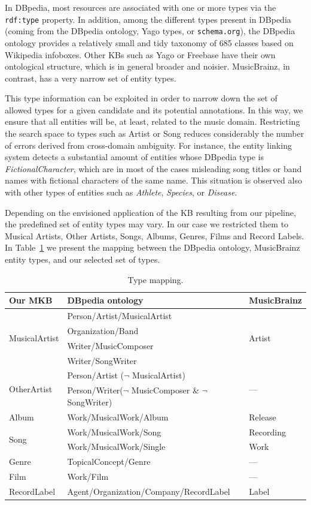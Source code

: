 In DBpedia, most resources are associated with one or more types via the \texttt{rdf:type} property. In addition, among the different types present in DBpedia (coming from the DBpedia ontology, Yago types, or \texttt{schema.org}), the DBpedia ontology provides a relatively small and tidy taxonomy of 685 classes based on Wikipedia infoboxes. Other KBs such as Yago or Freebase have their own ontological structure, which is in general broader and noisier. MusicBrainz, in contrast, has a very narrow set of entity types. 

This type information can be exploited in order to narrow down the set of allowed types for a given candidate and its potential annotations. In this way, we ensure that all entities will be, at least, related to the music domain. Restricting the search space to types such as Artist or Song reduces considerably the number of errors derived from cross-domain ambiguity. For instance, the entity linking system detects a substantial amount of entities whose DBpedia type is \textit{FictionalCharacter}, which are in most of the cases misleading song titles or band names with fictional characters of the same name. This situation is observed also with other types of entities such as \textit{Athlete}, \textit{Species}, or \textit{Disease}.

Depending on the envisioned application of the KB resulting from our pipeline, the predefined set of entity types may vary. In our case we restricted them to Musical Artists, Other Artists, Songs, Albums, Genres, Films and Record Labels. In Table~\ref{tbl:kb:type_mapping} we present the mapping between the DBpedia ontology, MusicBrainz entity types, and our selected set of types.

\begin{table}[]
\scriptsize
\centering
	\begin{tabular}{ l l l }
	\hline
\textbf{Our MKB} & \textbf{DBpedia ontology} & \textbf{MusicBrainz} \\
	\hline
\multirow{4}{*}{MusicalArtist} & Person/Artist/MusicalArtist & \multirow{4}{*}{Artist}\\ 
& Organization/Band & \\ 
& Writer/MusicComposer & \\ 
& Writer/SongWriter & \\
	\hline
\multirow{2}{*}{OtherArtist} & Person/Artist ($\neg$ MusicalArtist) & \multirow{2}{*}{---} \\
& Person/Writer($\neg$ MusicComposer \& $\neg$ SongWriter) & \\
    \hline
Album & Work/MusicalWork/Album & Release \\
    \hline
\multirow{2}{*}{Song} & Work/MusicalWork/Song & Recording \\
& Work/MusicalWork/Single & Work \\
    \hline
Genre & TopicalConcept/Genre & --- \\
    \hline
Film & Work/Film & --- \\
    \hline
RecordLabel & Agent/Organization/Company/RecordLabel & Label \\
    \hline
	\end{tabular}
	\caption{Type mapping.}
	\label{tbl:kb:type_mapping}
\end{table}
%

